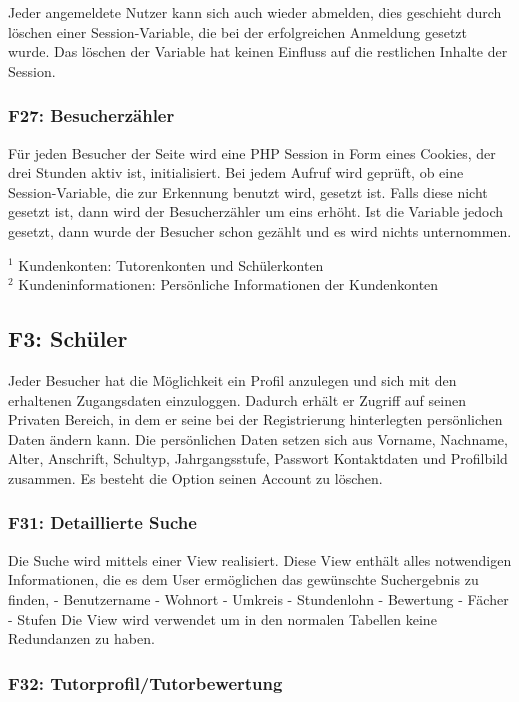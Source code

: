 \documentclass[10pt,a4paper]{scrartcl}
\begin{document}
Jeder angemeldete Nutzer kann sich auch wieder abmelden, dies geschieht durch löschen einer Session-Variable, die bei der erfolgreichen Anmeldung gesetzt wurde. Das löschen der Variable hat keinen Einfluss auf die restlichen Inhalte der Session.

\subsubsection*{F27: Besucherzähler}

Für jeden Besucher der Seite wird eine PHP Session in Form eines Cookies, der drei Stunden aktiv ist, initialisiert. Bei jedem Aufruf wird geprüft, ob eine Session-Variable, die zur Erkennung benutzt wird, gesetzt ist. Falls diese nicht gesetzt ist, dann wird der Besucherzähler um eins erhöht. Ist die Variable jedoch gesetzt, dann wurde der Besucher schon gezählt und es wird nichts unternommen.

\bigskip

$^1$ Kundenkonten: Tutorenkonten und Schülerkonten\\
$^2$ Kundeninformationen: Persönliche Informationen der Kundenkonten

\subsection{F3: Schüler}
Jeder Besucher hat die Möglichkeit ein Profil anzulegen und sich mit den erhaltenen Zugangsdaten einzuloggen.
Dadurch erhält er Zugriff auf seinen Privaten Bereich, in dem er seine bei der Registrierung hinterlegten persönlichen Daten ändern kann.
Die persönlichen Daten setzen sich aus Vorname, Nachname, Alter, Anschrift, Schultyp, Jahrgangsstufe, Passwort Kontaktdaten und Profilbild zusammen. 
Es besteht die Option seinen Account zu löschen.

\subsubsection*{F31: Detaillierte Suche}

Die Suche wird mittels einer View realisiert. Diese View enthält alles notwendigen Informationen, die es dem User ermöglichen das gewünschte Suchergebnis zu finden, 
 - Benutzername
 - Wohnort
 - Umkreis
 - Stundenlohn
 - Bewertung
 - Fächer
 - Stufen
Die View wird verwendet um in den normalen Tabellen keine Redundanzen zu haben. 

\subsubsection*{F32: Tutorprofil/Tutorbewertung}
\end{document}
